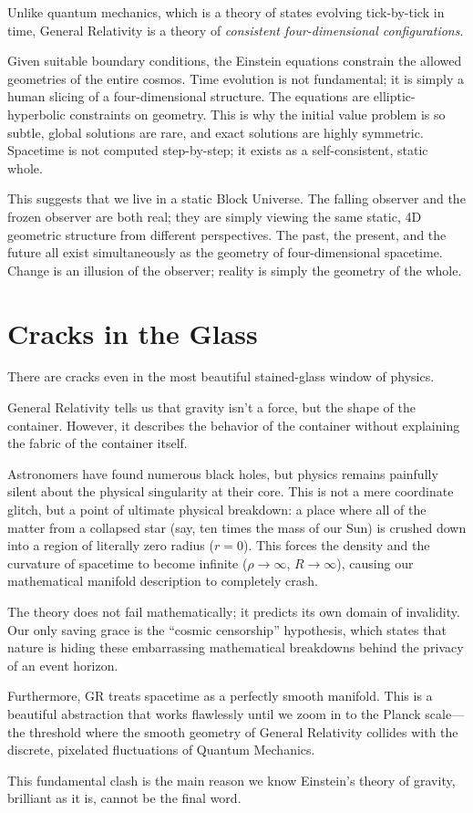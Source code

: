 Unlike quantum mechanics, which is a theory of states evolving tick-by-tick in time, General Relativity is a theory of \emph{consistent four-dimensional configurations}.

Given suitable boundary conditions, the Einstein equations constrain the allowed geometries of the entire cosmos.
Time evolution is not fundamental; it is simply a human slicing of a four-dimensional structure.
The equations are elliptic-hyperbolic constraints on geometry.
This is why the initial value problem is so subtle, global solutions are rare, and exact solutions are highly symmetric.
Spacetime is not computed step-by-step; it exists as a self-consistent, static whole.

This suggests that we live in a static Block Universe.
The falling observer and the frozen observer are both real; they are simply viewing the same static, 4D geometric structure from different perspectives.
The past, the present, and the future all exist simultaneously as the geometry of four-dimensional spacetime.
Change is an illusion of the observer; reality is simply the geometry of the whole.



\section{Cracks in the Glass}

There are cracks even in the most beautiful stained-glass window of physics. 

General Relativity tells us that gravity isn't a force, but the shape of the container.
However, it describes the behavior of the container without explaining the fabric of the container itself. 

Astronomers have found numerous black holes, but physics remains painfully silent about the physical singularity at their core.
This is not a mere coordinate glitch, but a point of ultimate physical breakdown: a place where all of the matter from a collapsed star (say, ten times the mass of our Sun) is crushed down into a region of literally zero radius ($r = 0$).
This forces the density and the curvature of spacetime to become infinite ($\rho \rightarrow \infty$, $R \rightarrow \infty$), causing our mathematical manifold description to completely crash.

The theory does not fail mathematically; it predicts its own domain of invalidity.
Our only saving grace is the ``cosmic censorship'' hypothesis, which states that nature is hiding these embarrassing mathematical breakdowns behind the privacy of an event horizon. 

Furthermore, GR treats spacetime as a perfectly smooth manifold.
This is a beautiful abstraction that works flawlessly until we zoom in to the Planck scale---the threshold where the smooth geometry of General Relativity collides with the discrete, pixelated fluctuations of Quantum Mechanics. 

This fundamental clash is the main reason we know Einstein's theory of gravity, brilliant as it is, cannot be the final word.

